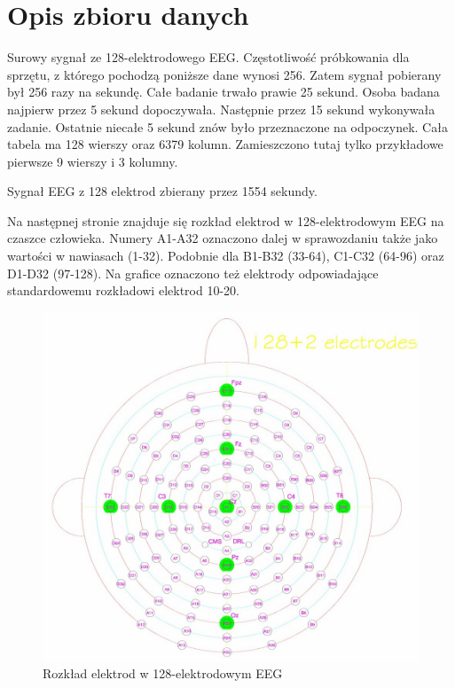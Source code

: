 \documentclass{article}
\begin{document}
\section{Opis zbioru danych}
    Surowy sygnał ze 128-elektrodowego  EEG.  Częstotliwość próbkowania dla sprzętu, z którego pochodzą poniższe dane wynosi 256. Zatem sygnał pobierany był 256 razy na sekundę. Całe badanie trwało prawie 25 sekund. Osoba badana najpierw przez 5 sekund dopoczywała. Następnie przez 15 sekund wykonywała zadanie. Ostatnie niecałe 5 sekund znów było przeznaczone na odpoczynek. 
    Cała tabela ma 128 wierszy oraz 6379 kolumn. Zamieszczono tutaj tylko przykładowe pierwsze 9 wierszy i 3 kolumny.
    \newline
    \begin{table}[h]
        \begin{center}
        \caption[Table caption text]{Sygnał EEG z 128 elektrod zbierany przez 1554 sekundy.}
        \end{center}
    \end{table}

    Na następnej stronie znajduje się rozkład elektrod w 128-elektrodowym EEG na czaszce człowieka. Numery A1-A32 oznaczono dalej w sprawozdaniu także jako wartości w nawiasach (1-32). Podobnie dla B1-B32 (33-64), C1-C32 (64-96) oraz D1-D32 (97-128). Na grafice oznaczono też elektrody odpowiadające standardowemu rozkładowi elektrod 10-20. 
    \newpage
    \begin{figure}[H]
        \begin{center} 
        \vspace{3cm}
        \includegraphics[width=\linewidth]{cap_128_layout_medium.jpg}
        \caption{Rozkład elektrod w 128-elektrodowym EEG}
        \end{center}
    \end{figure}
\end{document}
